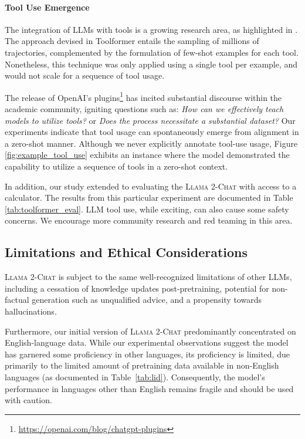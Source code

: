 \paragraph{Tool Use Emergence}
\label{sec:tool_use_emergence}

The integration of LLMs with tools is a growing research area, as highlighted in \cite{mialon2023augmented}. The approach devised in Toolformer \citep{schick2023toolformer} entails the sampling of millions of trajectories, complemented by the formulation of few-shot examples for each tool. Nonetheless, this technique was only applied using a single tool per example, and would not scale for a sequence of tool usage.

The release of OpenAI's plugins\footnote{\url{https://openai.com/blog/chatgpt-plugins}} has incited substantial discourse within the academic community, igniting questions such as: \emph{How can we effectively teach models to utilize tools?} or \emph{Does the process necessitate a substantial dataset?} Our experiments indicate that tool usage can spontaneously emerge from alignment in a zero-shot manner. Although we never explicitly annotate tool-use usage, Figure \ref{fig:example_tool_use} exhibits an instance where the model demonstrated the capability to utilize a sequence of tools in a zero-shot context.

In addition, our study extended to evaluating the \textsc{Llama 2-Chat} with access to a calculator. The results from this particular experiment are documented in Table \ref{tab:toolformer_eval}. LLM tool use, while exciting, can also cause some safety concerns. We encourage more community research and red teaming in this area.

\subsection{Limitations and Ethical Considerations}
\label{sec:limitations}

\textsc{Llama 2-Chat} is subject to the same well-recognized limitations of other LLMs, including a cessation of knowledge updates post-pretraining, potential for non-factual generation such as unqualified advice, and a propensity towards hallucinations.

Furthermore, our initial version of \textsc{Llama 2-Chat} predominantly concentrated on English-language data. While our experimental observations suggest the model has garnered some proficiency in other languages, its proficiency is limited, due primarily to the limited amount of pretraining data available in non-English languages (as documented in Table~\ref{tab:lid}). Consequently, the model's performance in languages other than English remains fragile and should be used with caution.

